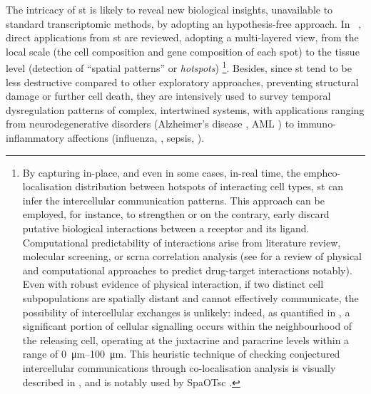 The intricacy of \acrshort{st} is likely to reveal new biological insights, unavailable to standard transcriptomic methods, by adopting an hypothesis-free approach. In ~\autocite[Fig.~2]{rao_etal21}, direct applications from \acrshort{st} are reviewed, adopting a multi-layered view, from the local scale (the cell composition and gene composition of each spot) to the tissue level (detection of \enquote{spatial patterns} or \emph{hotspots}) \footnote{
By capturing in-place, and even in some cases, in-real time, the emph{co-localisation} distribution between hotspots of interacting cell types, \acrshort{st} can infer the intercellular communication patterns.  This approach can be employed, for instance, to strengthen or on the contrary, early discard putative biological interactions between a receptor and its ligand. Computational predictability of interactions arise from literature review, molecular screening, or \acrshort{scrna} correlation analysis (see  for a review of physical and computational approaches to predict drug-target interactions notably). Even with robust evidence of physical interaction, if two distinct cell subpopulations are spatially distant and cannot effectively communicate, the possibility of intercellular exchanges is unlikely: indeed, as quantified in \autocite{armingol_etal21}, a significant portion of cellular signalling occurs within the neighbourhood of the releasing cell, operating at the juxtacrine and paracrine levels within a range of \qtyrange{0}{100}{\micro\meter}. This heuristic technique of checking conjectured intercellular communications through co-localisation analysis is visually described in \autocite[Figure 5]{longo_etal21}, and is notably used by SpaOTsc \autocite{cang_nie20}.}. 
Besides, since \acrshort{st} tend to be less destructive compared to other exploratory approaches, preventing structural damage or further cell death, they are intensively used to survey temporal dysregulation patterns of complex, intertwined systems, with applications ranging from neurodegenerative disorders (Alzheimer’s disease \autocite{chen_etal20}, AML \autocite{warnat-herresthal_etal20}) to immuno-inflammatory affections (influenza, \autocite{curras-alonso_etal21}, sepsis, \autocite{janosevic_etal21}). 

